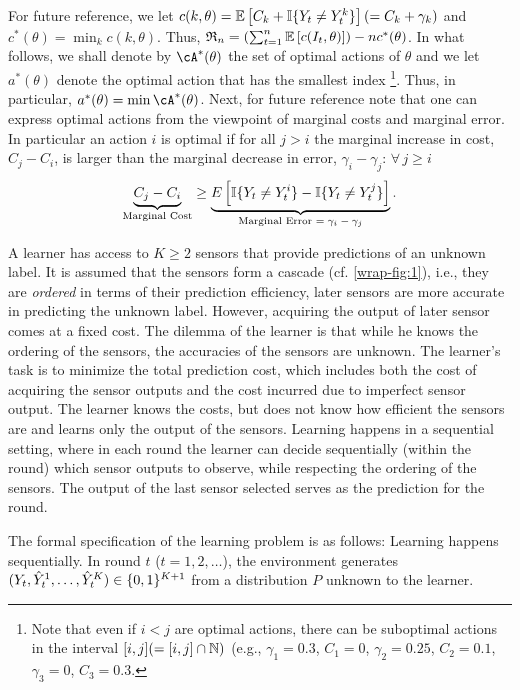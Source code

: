 For future reference, we let $c(k,\theta) = \mathbb{E}\left[ C_{k} +\mathbb{I}\{Y_t \ne Y_t^{k} \}\right]  (= C_k + \gamma_k)$ and $c^*(\theta) = \min_k c(k,\theta)$. Thus, $\mathfrak{R}_n =( \sum_{t=1}^n \mathbb{E}\left[ c(I_t,\theta) \right]) - n c^*(\theta)$.
In what follows, we shall denote by $\cA^*(\theta)$ the set of optimal actions of $\theta$
and we let $a^*(\theta)$ denote the optimal action that has the smallest index
\footnote{Note that even if $i<j$ are optimal actions, there can be suboptimal actions in the interval $[i,j] (=[i,j]\cap \mathbb{N})$
(e.g., $\gamma_1=0.3$, $C_1=0$, $\gamma_2=0.25$, $C_2=0.1$, $\gamma_3=0$, $C_3=0.3$.}. Thus,
in particular, $a^*(\theta) = \min \cA^*(\theta)$. 
Next, for future reference note that one 
can express optimal actions from the viewpoint of marginal costs and marginal error. 
In particular an action $i$ is optimal if for all $j > i$ the marginal increase in cost, $C_j - C_i$, 
is larger than the marginal decrease in error, $\gamma_i - \gamma_j$: $ \forall \, j \geq i\,$
%
\begin{equation} \label{eqn:interp_opt}
\vspace{-5pt}
\underbrace{C_j - C_i}_{\text{Marginal Cost}} \geq \underbrace{ E \left [ \ind{Y_t \ne Y_t^i} - \ind{Y_t \ne Y_t^j} \right ]}_{\text{Marginal Error $= \gamma_i-\gamma_j$}}.
\end{equation}


A learner has access to $K\geq 2$ sensors that provide predictions
of an unknown label. 
 It is assumed that the sensors form a cascade (cf. \cref{wrap-fig:1}),
i.e., they are  \emph{ordered} in terms of their prediction efficiency,
later sensors are more accurate in predicting the unknown label.
However, acquiring the output of later sensor comes at a fixed cost.
The dilemma of the learner is that while he knows the ordering of the sensors,
the accuracies of the sensors are unknown.
The learner's task is to minimize the total prediction cost, which includes
both the cost of acquiring the sensor outputs and the cost incurred due to imperfect
sensor output.
The learner knows the costs, but does not know how efficient the sensors are
and learns only the output of the sensors.
Learning happens in a sequential setting, where in each round the learner can decide
sequentially (within the round) which sensor outputs to observe,
while respecting the ordering of the sensors.
The output of the last sensor selected serves as the prediction for the round.

The formal specification of the learning problem is as follows:
Learning happens sequentially.
In round $t$ ($t=1,2,\dots$), 
the environment generates 
$(Y_t,\hat{Y}_t^1,\dots,\hat{Y}_t^K)\in \{0,1\}^{K+1}$ from a distribution $P$ unknown to the learner.

